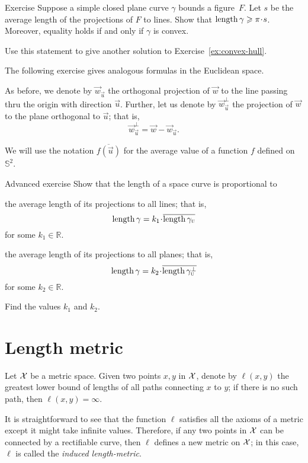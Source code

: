 \begin{thm}{Exercise}\label{ex:convex-croftons}
Suppose a simple closed plane curve $\gamma$ bounds a figure~$F$.
Let $s$ be the average length of the projections of $F$ to lines.
Show that $\length\gamma\ge \pi \cdot s$.
Moreover, equality holds if and only if $\gamma$ is convex.

Use this statement to give another solution to Exercise~\ref{ex:convex-hull}.
\end{thm}

The following exercise gives analogous formulas in the Euclidean space.

As before, we denote by $\vec w_{\vec u}$ the orthogonal projection of $\vec w$ to the line passing thru the origin with direction $\vec u$.
Further, let us denote by $\vec w_{\vec u}^\bot$ the projection of $\vec w$ to the plane orthogonal to $\vec u$;
that is,
\[\vec w_\vec u^\bot=\vec w - \vec w_{\vec u}.\]

We will use the notation 
$\overline{f(\vec u)}$ for the average value
of a function $f$ defined on $\mathbb{S}^2$.

\begin{thm}{Advanced exercise}\label{adex:more-croftons}
Show that the length of a space curve is proportional to 
\begin{subthm}{}
the average length of its projections to all lines; that is,
\[\length\gamma=k_1\cdot\overline{\length\gamma_{\vec u}}\]
for some $k_1 \in \mathbb{R}$.
\end{subthm}
\begin{subthm}{}the average length of its projections to all planes; that is,
\[\length\gamma=k_2\cdot\overline{\length\gamma_{\vec u}^\bot}\]
for some $k_2 \in \mathbb{R}$.
\end{subthm}
Find the values $k_1$ and $k_2$.
\end{thm}

\section{Length metric}\label{sec:Length metric}

Let $\mathcal{X}$ be a metric space.
Given two points $x,y$ in $\mathcal{X}$, denote by $\ell(x,y)$ the greatest lower bound of lengths of all paths connecting $x$ to $y$; if there is no such path, then $\ell(x,y)=\infty$.

It is straightforward to see that the function $\ell$ satisfies all the axioms of a metric except it might take infinite values.
Therefore, if any two points in $\mathcal{X}$ can be connected by a rectifiable curve, then $\ell$ defines a new metric on $\mathcal{X}$;
in this case, $\ell$ is called the \emph{induced length-metric}.

